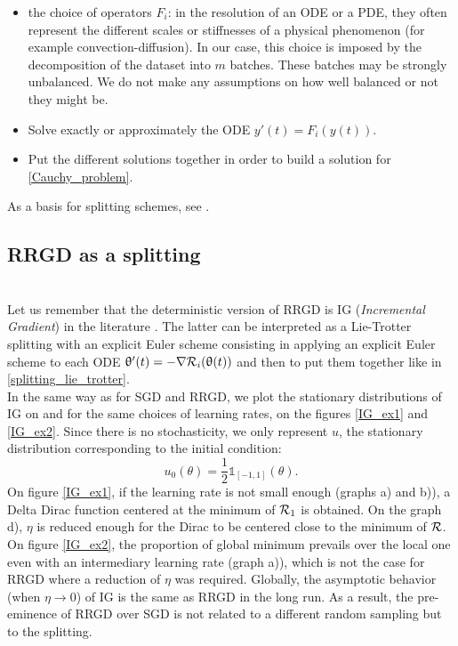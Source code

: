 \documentclass[article,authoryear,jmlmc]{beg_32}             %
\begin{document}
\begin{itemize}
	\item the choice of operators $F_i$: in the resolution of an ODE or a PDE, they often represent the different scales or stiffnesses of a physical phenomenon (for example convection-diffusion). In our case, this choice is imposed by the decomposition of the dataset into $m$ batches. 
          These batches may be strongly unbalanced. We do not make any assumptions on how well balanced or not they might be.
	\item Solve exactly or approximately the ODE $y'(t)=F_i(y(t))$.
	\item Put the different solutions together in order to build a solution for \eqref{Cauchy_problem}. 
\end{itemize}
As a basis for splitting schemes, see \cite{splitting_ode_review,splitting_ode_review2}.

\subsection{RRGD as a splitting}
~~\\
Let us remember that the deterministic version of RRGD is IG ({\it Incremental Gradient}) in the literature \cite{IG_proximal,despres2022neural}. The latter can be interpreted as a Lie-Trotter
splitting with an explicit Euler scheme consisting in applying an explicit Euler scheme to each ODE $\uptheta'(t)=-\nabla \mathcal{R}_i(\uptheta(t))$ and then to put them together like in \eqref{splitting_lie_trotter}. \\
In the same way as for SGD and RRGD, we plot the stationary distributions of IG on \exOne and \exTwo for the same choices of learning rates, on the figures \ref{IG_ex1} and \ref{IG_ex2}. Since there is no stochasticity, we only represent $u$, the stationary distribution corresponding to the initial condition:
\begin{equation*}
	u_0(\theta) = \frac{1}{2} \mathds{1}_{[-1,1]}(\theta).
\end{equation*}
On figure \ref{IG_ex1}, if the learning rate is not small enough (graphs a) and b)), a Delta Dirac function centered at the minimum of $\mathcal{R}_1$ is obtained. On the graph d), $\eta$ is reduced enough for the Dirac to be centered close to the minimum of $\mathcal{R}$. On figure \ref{IG_ex2}, the proportion of global minimum prevails over the local one even with an intermediary learning rate (graph a)), which is not the case for RRGD where a reduction of $\eta$ was required. Globally, the asymptotic behavior (when $\eta \to 0$) of IG is the same as RRGD in the long run. As a result, the pre-eminence of RRGD over SGD is not related to a different random sampling but to the splitting.
\end{document}
